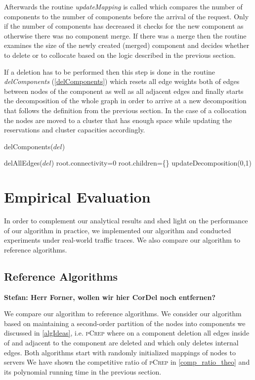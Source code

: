 \documentclass[a4paper,UKenglish,cleveref, autoref, thm-restate,authorcolumns]{lipics-v2019}
\newcommand{\adjDel}{\textsc{pCrep}}
\newcommand{\coreDel}{\text{C{\scriptsize REP}-C{\scriptsize ORE}}}
\newcommand\stefan[1]{{\color{blue}\textbf{Stefan: #1 }}}
\begin{document}
Afterwards the routine \textit{updateMapping} is called which compares the number of components to the number of components before the arrival of the request. Only if the number of components has decreased it checks for the new component as otherwise there was no component merge. 
If there was a merge then the routine examines the size of the newly created (merged) component and decides whether to delete or to collocate based on the logic described in the previous section.

If a deletion has to be performed then this step is done in the routine \textit{delComponents} (\cref{delComponents}) which resets all edge weights both of edges between nodes of the component as well as all adjacent edges and finally starts the decomposition of the whole graph in order to arrive at a new decomposition that follows the definition from the previous section.
In the case of a collocation the nodes are moved to a cluster that has enough space while updating the reservations and cluster capacities accordingly.



\begin{algorithm}
	\caption{delComponents($del$)}
	\label{delComponents}
	\begin{algorithmic}
		\STATE delAllEdges($del$)
		\STATE root.connectivity=0
		\STATE root.children=\{\}
		\STATE updateDecomposition(0,1)
	\end{algorithmic}
\end{algorithm}

\section{Empirical Evaluation}
\label{sec:evaluation}

In order to complement our analytical results and shed light
on the performance of our algorithm in practice, 
we implemented our algorithm and conducted experiments
under real-world traffic traces. 
We also compare our algorithm to reference algorithms.

\subsection{Reference Algorithms}
\label{algSection}

\stefan{Herr Forner, wollen wir hier CorDel noch entfernen?}

We compare our algorithm to reference algorithms. 
We consider our algorithm based on maintaining a second-order partition of the nodes into components we discussed in \cref{algIdeas}, 
i.e. \adjDel{} where on a component deletion all edges inside of and adjacent to the component are deleted and \coreDel{} which only deletes internal edges. 
Both algorithms start with randomly initialized mappings of nodes to servers
We have shown the competitive ratio of \adjDel{} in \cref{comp_ratio_theo} and its polynomial running time in the previous section.
\end{document}
